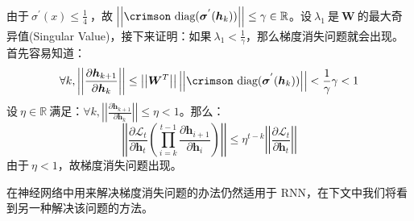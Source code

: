 \documentclass[12pt,a4paper]{article}
\begin{document}
由于$\:\sigma^{'}(x) \le \frac{1}{4}\:$，故$\:\left|\left|\text{\crimson diag}(\bm{\sigma}^{'}(\bm{h}_{k}))\right|\right| \le \gamma \in \mathbb{R}$。设$\:\lambda_1\:$是$\:\bm{W}\:$的最大{\hei 奇异值}({\crimson  Singular Value})，接下来证明：如果$\:\lambda_1 < \frac{1}{\gamma}$，那么梯度消失问题就会出现。首先容易知道：
\begin{equation}
\forall k, \left|\left|\frac{\partial \bm{h}_{k + 1}}{\partial \bm{h}_{k}}\right|\right| \le \left|\left|\bm{W}^{T}\right|\right|\left|\left|\text{\crimson diag}(\bm{\sigma}^{'}(\bm{h}_{k}))\right|\right| < \frac{1}{\gamma}\gamma < 1
\end{equation}
设$\:\eta \in \mathbb{R}\:$满足：$\forall k, \left|\left|\frac{\partial \bm{h}_{k + 1}}{\partial \bm{h}_{k}}\right|\right| \le \eta < 1$。那么：
\begin{equation}
\left|\left|\frac{\partial \mathcal{L}_t}{\partial \bm{h}_t}\left(\prod_{i=k}^{t-1}\frac{\partial \bm{h}_{i + 1}}{\partial \bm{h}_{i}}\right)\right|\right| \le \eta^{t-k}\left|\left|\frac{\partial \mathcal{L}_t}{\partial \bm{h}_t}\right|\right|
\end{equation}
由于$\:\eta < 1$，故梯度消失问题出现。

在神经网络中用来解决梯度消失问题的办法仍然适用于 {\crimson RNN}，在下文中我们将看到另一种解决该问题的方法。
\end{document}
